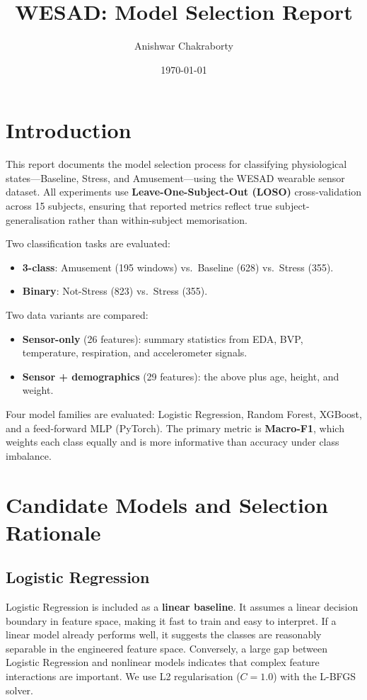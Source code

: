 \documentclass[11pt]{article}
\title{WESAD: Model Selection Report}
\author{Anishwar Chakraborty}
\date{\today}
\begin{document}
\maketitle

\section{Introduction}

This report documents the model selection process for classifying physiological states---Baseline, Stress, and Amusement---using the WESAD wearable sensor dataset.
All experiments use \textbf{Leave-One-Subject-Out (LOSO)} cross-validation across 15 subjects, ensuring that reported metrics reflect true subject-generalisation rather than within-subject memorisation.

Two classification tasks are evaluated:
\begin{itemize}
    \item \textbf{3-class}: Amusement (195 windows) vs.\ Baseline (628) vs.\ Stress (355).
    \item \textbf{Binary}: Not-Stress (823) vs.\ Stress (355).
\end{itemize}

Two data variants are compared:
\begin{itemize}
    \item \textbf{Sensor-only} (26 features): summary statistics from EDA, BVP, temperature, respiration, and accelerometer signals.
    \item \textbf{Sensor + demographics} (29 features): the above plus age, height, and weight.
\end{itemize}

Four model families are evaluated: Logistic Regression, Random Forest, XGBoost, and a feed-forward MLP (PyTorch).
The primary metric is \textbf{Macro-F1}, which weights each class equally and is more informative than accuracy under class imbalance.

\section{Candidate Models and Selection Rationale}

\subsection{Logistic Regression}
Logistic Regression is included as a \textbf{linear baseline}.
It assumes a linear decision boundary in feature space, making it fast to train and easy to interpret.
If a linear model already performs well, it suggests the classes are reasonably separable in the engineered feature space.
Conversely, a large gap between Logistic Regression and nonlinear models indicates that complex feature interactions are important.
We use L2 regularisation ($C=1.0$) with the L-BFGS solver.
\end{document}
